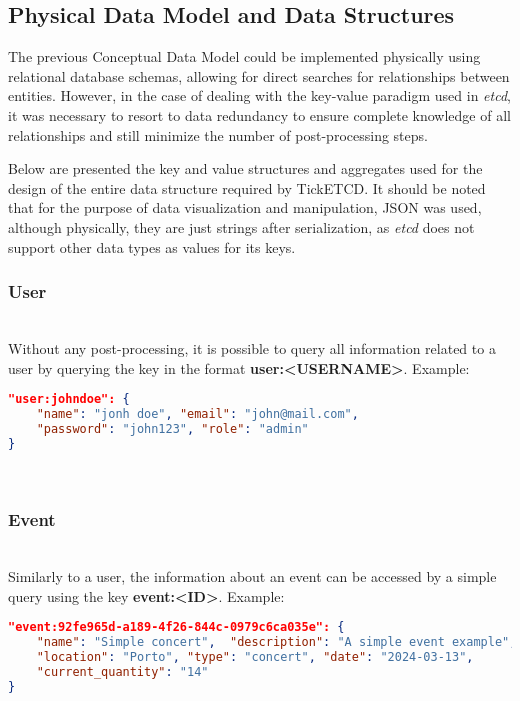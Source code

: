 \documentclass[screen,review]{acmart}
\begin{document}
\subsection{Physical Data Model and Data Structures}
The previous Conceptual Data Model could be implemented physically using relational database schemas, allowing for direct searches for relationships between entities. However, in the case of dealing with the key-value paradigm used in \textit{etcd}, it was necessary to resort to data redundancy to ensure complete knowledge of all relationships and still minimize the number of post-processing steps.

Below are presented the key and value structures and aggregates used for the design of the entire data structure required by TickETCD. It should be noted that for the purpose of data visualization and manipulation, JSON was used, although physically, they are just strings after serialization, as \textit{etcd} does not support other data types as values for its keys. \\

\subsubsection{User}~\\
Without any post-processing, it is possible to query all information related to a user by querying the key in the format \textbf{user:<USERNAME>}. Example:

\begin{lstlisting}[language=json]
"user:johndoe": { 
    "name": "jonh doe", "email": "john@mail.com", 
    "password": "john123", "role": "admin"
}
\end{lstlisting}
\newline
\\ 
\subsubsection{Event}~\\
Similarly to a user, the information about an event can be accessed by a simple query using the key \textbf{event:<ID>}. Example:

\begin{lstlisting}[language=json]
"event:92fe965d-a189-4f26-844c-0979c6ca035e": {
    "name": "Simple concert",  "description": "A simple event example", 
    "location": "Porto", "type": "concert", "date": "2024-03-13",
    "current_quantity": "14"
}
\end{lstlisting}\\
\end{document}
